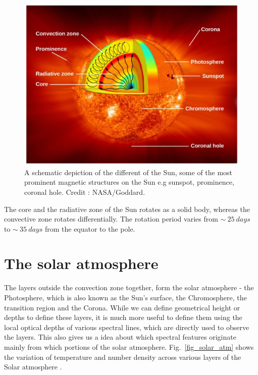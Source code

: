 \begin{figure}[ht!]
    \centering
    \includegraphics[width = 0.8\linewidth]{Figures/solar_int.png}
    \caption{A schematic depiction of the different  of the Sun,  some of the most prominent magnetic structures on the Sun e.g sunspot, prominence, coronal hole. Credit : NASA/Goddard.}
    \label{fig_solar_int}
\end{figure}

The core and the radiative zone of the Sun rotates as a solid body, whereas the convective zone rotates differentially. The rotation period varies from $\sim~25~days$ to $\sim~35~days$ from the equator to the pole.

\section{The solar atmosphere}\label{solar_atmos}

The layers outside the convection zone together, form the solar atmosphere - the Photosphere, which is also known as the Sun's surface, the Chromosphere, the transition region and the Corona. While we can define geometrical height or depths to define these layers, it is much more useful to define them using the local optical depths of various spectral lines, which are directly used to observe the layers. This also gives us a idea about which spectral features originate mainly from which portions of the solar atmosphere. Fig.~\ref{fig_solar_atm} shows the variation of temperature and number density across various layers of the Solar atmosphere .

